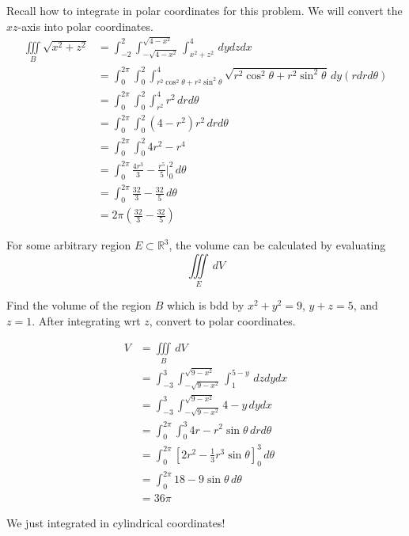 \begin{solution}
    Recall how to integrate in polar coordinates for this problem. We will convert the \(xz\)-axis into polar coordinates.
    \begin{align*}
        \iiint\limits_{B}\sqrt{x^2 +z^2}  &= \int_{-2}^2 \int_{-\sqrt{4-x^2} }^{\sqrt{4-x^2} }\int_{x^2 +z^2}^4\, dydzdx\\
        &= \int_0^{2\pi }\int_0^2 \int_{r^2 \cos^2\theta +r^{2}\sin ^2\theta  }^4 \sqrt{r^2 \cos ^2 \theta +r^2 \sin ^2\theta } \,dy(rdrd \theta )\\
        &=\int_0^{2\pi }\int_0^2 \int_{r^2}^4 r^2 \,drd \theta \\
        &=\int_0^{2\pi }\int_0^2 \left( 4-r^2 \right)r^2\,drd \theta \\
        &=\int_0^{2\pi }\int_0^2 4r^2 -r^4\\
        &=\int_0^{2\pi } \frac{4r^3}{3}-\frac{r^5}{5}\biggl\vert_0^2\,d \theta \\
        &=\int_0^{2\pi }\frac{32}{3}-\frac{32}{5}\,d \theta \\
        &=2\pi \left( \frac{32}{3}-\frac{32}{5} \right) 
    \end{align*}
\end{solution}
\begin{theorem}
    For some arbitrary region \(E \subset \mathbb{R}^3\), the volume can be calculated by evaluating 
    \[
        \iiint\limits_{E}\,dV
    \]
\end{theorem}
\begin{exercise}
    Find the volume of the region \(B\) which is bdd by \(x^2 +y^2 =9\), \(y+z=5\), and \(z=1\). After integrating wrt \(z\), convert to polar coordinates.
\end{exercise}
\begin{solution}
    \begin{align*}
        V&=\iiint\limits_{B}\,dV\\
        &=\int_{-3}^3 \int_{-\sqrt{9-x^2} }^{\sqrt{9-x^2} }\int_1^{5-y}\,dzdydx\\
        &=\int_{-3}^3 \int_{-\sqrt{9-x^2} }^{\sqrt{9-x^2} } 4-y\,dydx\\
        &=\int_{0}^{2\pi }\int_0^3 4r-r^2\sin \theta \,drd \theta \\
        &=\int_0^{2\pi } \left[2r^2 -\frac{1}{3}r^3 \sin \theta \right]_0^3 \,d \theta \\
        &=\int_0^{2\pi }18-9\sin \theta \,d \theta \\
        &=36\pi
    \end{align*}
\end{solution}
We just integrated in cylindrical coordinates!

